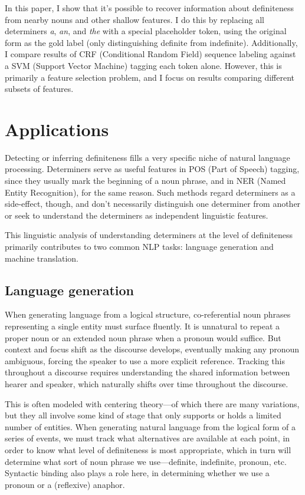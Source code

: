 \documentclass[11pt]{article}
\begin{document}
In this paper, I show that it's possible to recover information about definiteness from nearby nouns and other shallow features. I do this by replacing all determiners \emph{a}, \emph{an}, and \emph{the} with a special placeholder token, using the original form as the gold label (only distinguishing definite from indefinite). Additionally, I compare results of CRF (Conditional Random Field) sequence labeling against a SVM (Support Vector Machine) tagging each token alone.
However, this is primarily a feature selection problem, and I focus on results comparing different subsets of features.





\section{Applications}
Detecting or inferring definiteness fills a very specific niche of natural language processing. Determiners serve as useful features in POS (Part of Speech) tagging, since they usually mark the beginning of a noun phrase, and in NER (Named Entity Recognition), for the same reason. Such methods regard determiners as a side-effect, though, and don't necessarily distinguish one determiner from another or seek to understand the determiners as independent linguistic features.

This linguistic analysis of understanding determiners at the level of definiteness primarily contributes to two common NLP tasks: language generation and machine translation.

\subsection{Language generation}
When generating language from a logical structure, co-referential noun phrases representing a single entity must surface fluently. It is unnatural to repeat a proper noun or an extended noun phrase when a pronoun would suffice. But context and focus shift as the discourse develops, eventually making any pronoun ambiguous, forcing the speaker to use a more explicit reference. Tracking this throughout a discourse requires understanding the shared information between hearer and speaker, which naturally shifts over time throughout the discourse.

This is often modeled with centering theory---of which there are many variations, but they all involve some kind of stage that only supports or holds a limited number of entities. When generating natural language from the logical form of a series of events, we must track what alternatives are available at each point, in order to know what level of definiteness is most appropriate, which in turn will determine what sort of noun phrase we use---definite, indefinite, pronoun, etc. Syntactic binding also plays a role here, in determining whether we use a pronoun or a (reflexive) anaphor.
\end{document}
